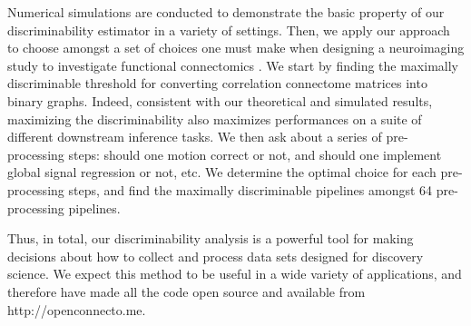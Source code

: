 \documentclass{article}
\begin{document}
Numerical simulations are conducted to demonstrate the basic property of our discriminability estimator in a variety of settings. Then, we apply our approach to choose amongst a set of choices one must make when designing a neuroimaging study to investigate functional connectomics \cite{fox2005human,biswal2010toward}. We start by finding the maximally discriminable threshold for converting correlation connectome matrices into binary graphs. Indeed, consistent with our theoretical and simulated results, maximizing the discriminability also maximizes performances on a suite of different downstream inference tasks. We then ask about a series of pre-processing steps: should one motion correct or not, and should one implement global signal regression or not, etc. We determine the optimal choice for each pre-processing steps, and find the maximally discriminable pipelines amongst 64 pre-processing pipelines.

Thus, in total, our discriminability analysis is a powerful tool for making decisions about how to collect and process data sets designed for discovery science. We expect this method to be useful in a wide variety of applications,
and therefore have made all the code open source and available from http://openconnecto.me.
\end{document}
